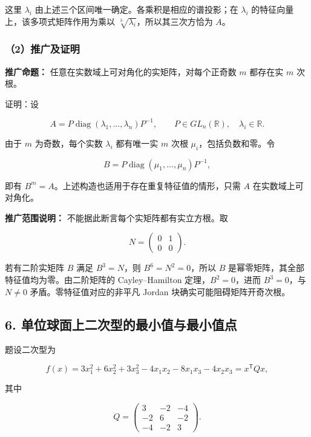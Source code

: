 \documentclass[11pt,fontset=fandol]{ctexart}
\begin{document}
这里 \(\lambda_i\) 由上述三个区间唯一确定。各乘积是相应的谱投影；在
\(\lambda_i\) 的特征向量上，该多项式矩阵作用为乘以
\(\sqrt[3]{\lambda_i}\)，所以其三次方恰为 \(A\)。

\subsubsection{（2）推广及证明}\label{ux63a8ux5e7fux53caux8bc1ux660e}

\textbf{推广命题：} 任意在实数域上可对角化的实矩阵，对每个正奇数 \(m\)
都存在实 \(m\) 次根。

证明：设

\[
A=P\operatorname{diag}(\lambda_1,\ldots,\lambda_n)P^{-1},
\qquad P\in GL_n(\mathbb R),\quad\lambda_i\in\mathbb R.
\]

由于 \(m\) 为奇数，每个实数 \(\lambda_i\) 都有唯一实 \(m\) 次根
\(\mu_i\)，包括负数和零。令

\[
B=P\operatorname{diag}(\mu_1,\ldots,\mu_n)P^{-1},
\]

即有 \(B^m=A\)。上述构造也适用于存在重复特征值的情形，只需 \(A\)
在实数域上可对角化。

\textbf{推广范围说明：} 不能据此断言每个实矩阵都有实立方根。取

\[
N=\begin{pmatrix}0&1\\0&0\end{pmatrix}.
\]

若有二阶实矩阵 \(B\) 满足 \(B^3=N\)，则 \(B^6=N^2=0\)，所以 \(B\)
是幂零矩阵，其全部特征值均为零。由二阶矩阵的 Cayley--Hamilton
定理，\(B^2=0\)，进而 \(B^3=0\)，与 \(N\ne0\) 矛盾。零特征值对应的非平凡
Jordan 块确实可能阻碍矩阵开奇次根。

\subsection{6.
单位球面上二次型的最小值与最小值点}\label{ux5355ux4f4dux7403ux9762ux4e0aux4e8cux6b21ux578bux7684ux6700ux5c0fux503cux4e0eux6700ux5c0fux503cux70b9}

题设二次型为

\[
f(x)=3x_1^2+6x_2^2+3x_3^2-4x_1x_2-8x_1x_3-4x_2x_3
=x^{\mathsf T}Qx,
\]

其中

\[
Q=\begin{pmatrix}3&-2&-4\\-2&6&-2\\-4&-2&3\end{pmatrix}.
\]
\end{document}

